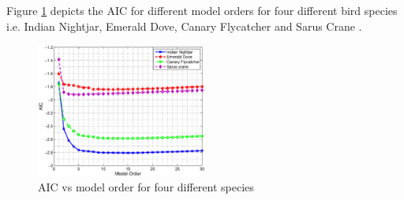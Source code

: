 \documentclass[a4paper]{article}
\begin{document}
 
 
%


 Figure \ref{fig:species_4} depicts the AIC for different model orders for four
 different bird species i.e. Indian Nightjar, Emerald Dove, Canary Flycatcher
 and Sarus Crane . 
 
 
 \begin{figure}[!ht]
	\centering
	\includegraphics[width=0.5\textwidth,height=7 cm] {species_4.eps}
	\caption{AIC vs model order for four different species }   
	\label{fig:species_4}
\end{figure} 
 
 
 
 
%
% 
% 
 
 
 
 
\end{document}
